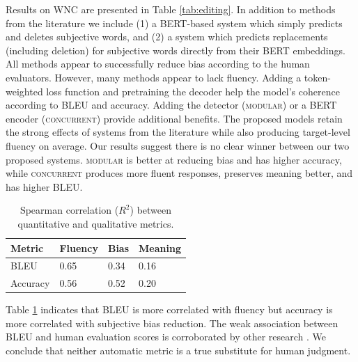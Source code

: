 Results on WNC are presented in Table \ref{tab:editing}. In addition to methods from the literature we include (1) a BERT-based system which simply predicts and deletes subjective words, and (2) a system which predicts replacements (including deletion) for subjective words directly from their BERT embeddings. All methods appear to successfully reduce bias according to the human evaluators. However, many methods appear to lack fluency. %
Adding a token-weighted loss function and pretraining the decoder help the model's coherence according to BLEU and accuracy. Adding the detector (\textsc{modular}) or a BERT encoder (\textsc{concurrent}) provide additional benefits. The proposed models retain the strong effects of systems from the literature while also producing target-level fluency on average. Our results suggest there is no clear winner between our two proposed systems. \textsc{modular} is better at reducing bias and has higher accuracy, while \textsc{concurrent} produces more fluent responses, preserves meaning better, and has higher BLEU. 

\begin{table}[]
\centering
\begin{tabular}{l|lll}
\textbf{Metric}  & \textbf{Fluency} & \textbf{Bias} & \textbf{Meaning}  \\ \hline \hline
BLEU     & 0.65   & 0.34   & 0.16 \\ %
Accuracy & 0.56   & 0.52   & 0.20\\ %
\end{tabular}
\caption{Spearman correlation ($R^2$) between quantitative and qualitative metrics.}
\label{tab:correlations}
\end{table}

Table \ref{tab:correlations} indicates that BLEU is more correlated with fluency but accuracy is more correlated with subjective bias reduction. The weak association between BLEU and human evaluation scores is corroborated by other research \cite{chaganty2018price,mir2019evaluating}. We conclude that neither automatic metric is a true substitute for human judgment. 

